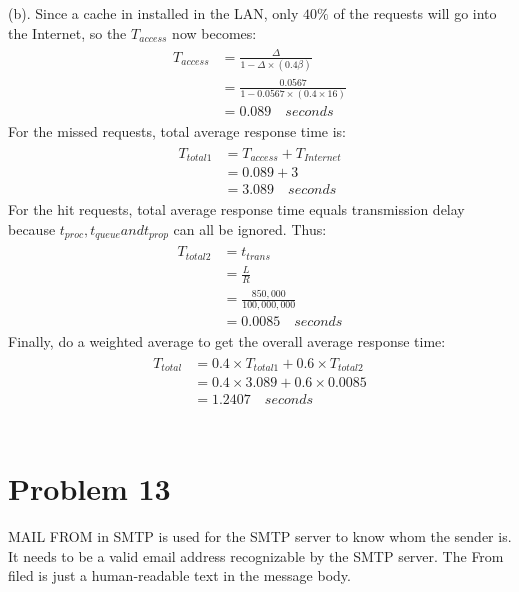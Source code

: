 \documentclass[titlepage, paper=a4, fontsize=11pt]{scrartcl} %
\numberwithin{equation}{section} %
\numberwithin{figure}{section} %
\numberwithin{table}{section} %
\begin{document}
(b). Since a cache in installed in the LAN, only $40\%$ of the requests will go into the Internet,
so the $T_{access}$ now becomes:
\begin{align*} 
\begin{split}
T_{access} &= \frac{\Delta}{1-\Delta \times (0.4\beta)} \\
&= \frac{0.0567}{1-0.0567 \times (0.4 \times 16)} \\
&= 0.089 \quad seconds
\end{split}					
\end{align*}
For the missed requests, total average response time is:
\begin{align*} 
\begin{split}
T_{total1} &= T_{access} + T_{Internet} \\
&= 0.089 + 3 \\
&= 3.089 \quad seconds
\end{split}					
\end{align*}
For the hit requests, total average response time equals transmission delay because
$t_{proc}, t_{queue} and t_{prop}$ can all be ignored. Thus:
\begin{align*} 
\begin{split}
T_{total2} &= t_{trans} \\
&= \frac{L}{R} \\
&= \frac{850,000}{100,000,000} \\
&= 0.0085 \quad seconds
\end{split}					
\end{align*}
Finally, do a weighted average to get the overall average response time:
\begin{align*} 
\begin{split}
T_{total} &= 0.4 \times T_{total1} + 0.6 \times T_{total2} \\
&= 0.4 \times 3.089 + 0.6 \times 0.0085 \\
&= 1.2407 \quad seconds
\end{split}					
\end{align*}
\\



\section*{Problem 13}
MAIL FROM in SMTP is used for the SMTP server to know whom the sender is. It needs to be a valid
email address recognizable by the SMTP server. The From filed is just a human-readable text in the message body.
\\
\end{document}
